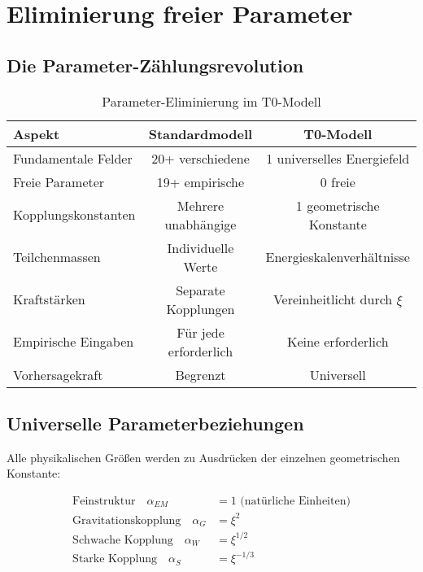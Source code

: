 \documentclass[12pt,a4paper]{report}
\begin{document}
	\section{Eliminierung freier Parameter}
	\label{sec:elimination_free_parameters}
	
	\subsection{Die Parameter-Zählungsrevolution}
	\label{subsec:parameter_count_revolution}
	
	\begin{table}[htbp]
		\centering
		\begin{tabular}{lcc}
			\toprule
			\textbf{Aspekt} & \textbf{Standardmodell} & \textbf{T0-Modell} \\
			\midrule
			Fundamentale Felder & 20+ verschiedene & 1 universelles Energiefeld \\
			Freie Parameter & 19+ empirische & 0 freie \\
			Kopplungskonstanten & Mehrere unabhängige & 1 geometrische Konstante \\
			Teilchenmassen & Individuelle Werte & Energieskalenverhältnisse \\
			Kraftstärken & Separate Kopplungen & Vereinheitlicht durch $\xi$ \\
			Empirische Eingaben & Für jede erforderlich & Keine erforderlich \\
			Vorhersagekraft & Begrenzt & Universell \\
			\bottomrule
		\end{tabular}
		\caption{Parameter-Eliminierung im T0-Modell}
		\label{tab:parameter_elimination}
	\end{table}
	
	\subsection{Universelle Parameterbeziehungen}
	\label{subsec:universal_parameter_relations}
	
	Alle physikalischen Größen werden zu Ausdrücken der einzelnen geometrischen Konstante:
	
	\begin{align}
		\text{Feinstruktur} \quad \alpha_{EM} &= 1 \text{ (natürliche Einheiten)} \\
		\text{Gravitationskopplung} \quad \alpha_G &= \xi^2 \\
		\text{Schwache Kopplung} \quad \alpha_W &= \xi^{1/2} \\
		\text{Starke Kopplung} \quad \alpha_S &= \xi^{-1/3}
	\end{align}
	
\end{document}
